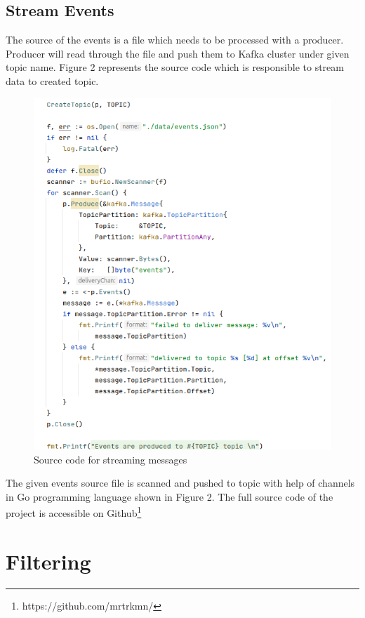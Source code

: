 \documentclass[sigplan,screen]{acmart}
\begin{document}
\subsection{Stream Events}
The source of the events is a file which needs to be processed with a producer. Producer will read through the file and push them to Kafka cluster under given topic name. Figure 2 represents the source code which is responsible to stream data to created topic. 
\begin{figure}[H]
    \centerline{\includegraphics[scale=.4]{assets/producer-code.png}}
    \caption{Source code for streaming messages}
    \label{fig}
\end{figure}
The given events source file is scanned and pushed to topic with help of channels in Go programming language shown in Figure 2. The full source code of the project is accessible on Github\footnote{https://github.com/mrtrkmn/}

\section{Filtering}
\end{document}

